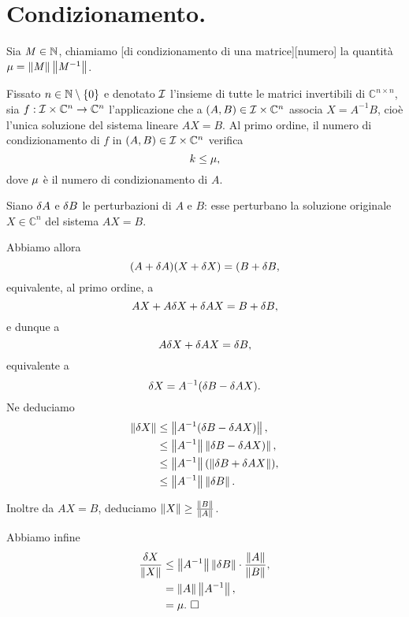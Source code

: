 \section{Condizionamento.}
\label{MetodiNumericiPerLaRisoluzioneDiSistemiLineari_Condizionamento}
\begin{Definition}
  Sia $\mathit{M} \in \mathbb{N}$, chiamiamo
  [di condizionamento di una matrice][numero]
  la quantit\`a $\MatrixConditionNumber = \Norm{\Matrix}\Norm{\Matrix^{-1}}$.
\end{Definition}
\begin{Theorem}
  Fissato $n \in \mathbb{N} \setminus \lbrace 0 \rbrace$
  e denotato $\mathcal{I}$ l'insieme di tutte le matrici invertibili di
  $\mathbb{C}^{n \times n}$, sia
  $f: \mathcal{I} \times \mathbb{C}^n \rightarrow \mathbb{C}^n$
  l'applicazione che a
  $(A,B) \in \mathcal{I} \times \mathbb{C}^n$
  associa $X = A^{-1}B$, cio\`e l'unica soluzione del sistema lineare
  $AX = B$.
  Al primo ordine, il numero di condizionamento di $f$ in
  $(A,B) \in \mathcal{I} \times \mathbb{C}^n$
  verifica
  \[
    k \leq \mu,
  \]
  dove $\mu$ \`e il numero di condizionamento di $A$.
\end{Theorem}
\Proof Siano $\Perturbation{A}$ e $\Perturbation{B}$ le perturbazioni di $A$ e
$B$: esse perturbano la soluzione originale $X \in \mathbb{C}^n$ del sistema
$AX = B$.
\par Abbiamo allora
\[
  (A + \Perturbation{A})(X + \Perturbation{X}) = (B + \Perturbation{B},
\]
equivalente, al primo ordine, a
\[
  AX + A\Perturbation{X} + \Perturbation{A}X = B + \Perturbation{B},
\]
e dunque a
\[
  A\Perturbation{X} + \Perturbation{A}X = \Perturbation{B},
\]
equivalente a
\[
  \Perturbation{X}
  = A^{-1}(\Perturbation{B} - \Perturbation{A}X).
\]
Ne deduciamo
\begin{align*}
  \Norm{\Perturbation{X}}
  &\leq \Norm{A^{-1}(\Perturbation{B} - \Perturbation{A}X)},\\
  &\leq \Norm{A^{-1}}\Norm{\Perturbation{B} - \Perturbation{A}X)},\\
  &\leq \Norm{A^{-1}}(\Norm{\Perturbation{B} + \Perturbation{A}X}),\\
  &\leq \Norm{A^{-1}}\Norm{\Perturbation{B}}.
\end{align*}
\par Inoltre da $AX = B$, deduciamo $\Norm{X} \geq \frac{\Norm{B}}{\Norm{A}}$.
\par Abbiamo infine
\begin{align*}
  \frac{\Perturbation{X}}{\Norm{X}}
  &\leq \Norm{A^{-1}}\Norm{\Perturbation{B}} \cdot \frac{\Norm{A}}{\Norm{B}},\\
  &= \Norm{A}\Norm{A^{-1}},\\
  &= \MatrixConditionNumber.\text{ \EndProof}
\end{align*}
